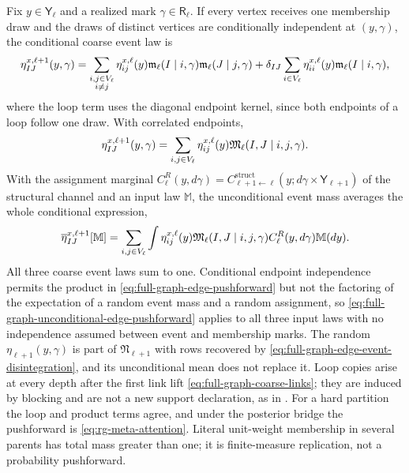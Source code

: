 Fix $y\in\mathsf Y_\ell$ and a realized mark $\gamma\in\mathsf R_\ell$. If every
vertex receives one membership draw and the draws of distinct vertices are
conditionally independent at $(y,\gamma)$, the conditional coarse event law is
\begin{equation}
\eta^{x,\ell+1}_{IJ}(y,\gamma)
=\sum_{\substack{i,j\in V_\ell\\ i\ne j}}\eta^{x,\ell}_{ij}(y)
\mathfrak m_\ell(I\mid i,\gamma)\mathfrak m_\ell(J\mid j,\gamma)
+\delta_{IJ}\sum_{i\in V_\ell}\eta^{x,\ell}_{ii}(y)\mathfrak m_\ell(I\mid i,\gamma),
\label{eq:full-graph-edge-pushforward}
\end{equation}
where the loop term uses the diagonal endpoint kernel, since both endpoints of a loop
follow one draw. With correlated endpoints,
\begin{equation}
\eta^{x,\ell+1}_{IJ}(y,\gamma)
=\sum_{i,j\in V_\ell}\eta^{x,\ell}_{ij}(y)\mathfrak M_\ell(I,J\mid i,j,\gamma).
\label{eq:full-graph-correlated-edge-pushforward}
\end{equation}
With the assignment marginal $C^R_\ell(y,d\gamma)=C^{\mathrm{struct}}_{\ell+1\leftarrow\ell}(y;d\gamma\times\mathsf
Y_{\ell+1})$ of the structural channel and an input law $\mathbb M$, the unconditional
event mass averages the whole conditional expression,
\begin{equation}
\overline\eta^{x,\ell+1}_{IJ}[\mathbb M]
=\sum_{i,j\in V_\ell}\int\eta^{x,\ell}_{ij}(y)\mathfrak M_\ell(I,J\mid i,j,\gamma)
C^R_\ell(y,d\gamma)\mathbb M(dy).
\label{eq:full-graph-unconditional-edge-pushforward}
\end{equation}
All three coarse event laws sum to one. Conditional endpoint independence permits the
product in \eqref{eq:full-graph-edge-pushforward} but not the factoring of the
expectation of a random event mass and a random assignment, so
\eqref{eq:full-graph-unconditional-edge-pushforward} applies to all three input laws
with no independence assumed between event and membership marks. The random
$\eta_{\ell+1}(y,\gamma)$ is part of $\mathfrak N_{\ell+1}$ with rows recovered by
\eqref{eq:full-graph-edge-event-disintegration}, and its unconditional mean does not
replace it. Loop copies arise at every depth after the first link lift
\eqref{eq:full-graph-coarse-links}; they are induced by blocking and are not a new
support declaration, as in . For a hard
partition the loop and product
terms agree, and under the posterior bridge the pushforward is
\eqref{eq:rg-meta-attention}. Literal unit-weight membership in several parents has
total mass greater than one; it is finite-measure replication, not a probability
pushforward. 

